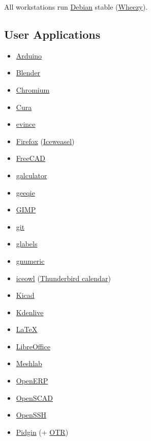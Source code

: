 All workstations run \href{http://www.debian.org/}{Debian} stable (\href{https://www.debian.org/releases/wheezy/}{Wheezy}).

\subsection{User Applications}
\begin{itemize}
\item \href{http://www.arduino.cc/}{Arduino}
\item \href{http://www.blender.org/}{Blender}
\item \href{http://www.chromium.org/}{Chromium}
\item \href{https://lulzbot.com/cura}{Cura}
\item \href{http://www.gnome.org/projects/evince/}{evince}
\item \href{http://www.mozilla.org/en-US/firefox/}{Firefox} (\href{https://wiki.debian.org/Iceweasel}{Iceweasel})
\item \href{http://www.freecadweb.org/}{FreeCAD}
\item \href{http://galculator.sourceforge.net/}{galculator}
\item \href{http://geeqie.sourceforge.net/}{geeqie}
\item \href{http://www.gimp.org/}{GIMP}
\item \href{http://git-scm.com/}{git}
\item \href{http://glabels.sourceforge.net/}{glabels}
\item \href{http://www.gnumeric.org/}{gnumeric}
\item \href{https://packages.debian.org/wheezy/iceowl-extension}{iceowl} (\href{http://www.mozilla.org/en-US/thunderbird/}{Thunderbird calendar})
\item \href{http://iut-tice.ujf-grenoble.fr/kicad/}{Kicad}
\item \href{http://www.kdenlive.org/}{Kdenlive}
\item \href{http://www.latex-project.org/}{LaTeX}
\item \href{https://www.libreoffice.org/}{LibreOffice}
\item \href{http://meshlab.sourceforge.net/}{Meshlab}
\item \href{http://www.openerp.com/}{OpenERP}
\item \href{http://www.openscad.org/}{OpenSCAD}
\item \href{http://www.openssh.com/}{OpenSSH}
\item \href{http://www.pidgin.im/}{Pidgin} (+ \href{https://otr.cypherpunks.ca/}{OTR})

\end{itemize}
